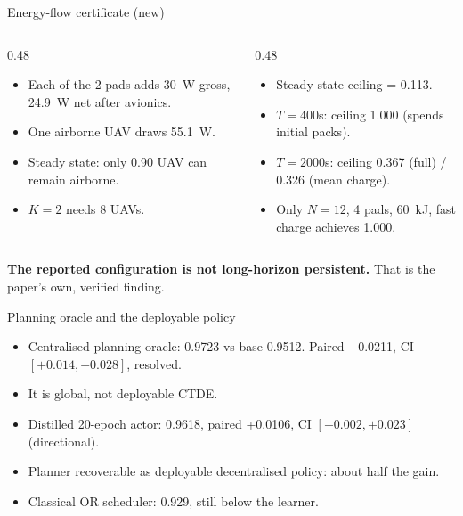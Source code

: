 \documentclass[aspectratio=169,10pt]{beamer}
\begin{document}
\begin{frame}{Energy-flow certificate (new)}
  \begin{columns}
    \begin{column}{0.48\textwidth}
      \small
      \begin{itemize}
        \item Each of the 2 pads adds 30~W gross, 24.9~W net after avionics.
        \item One airborne UAV draws 55.1~W.
        \item Steady state: only 0.90 UAV can remain airborne.
        \item $K{=}2$ needs 8 UAVs.
      \end{itemize}
    \end{column}
    \begin{column}{0.48\textwidth}
      \small
      \begin{itemize}
        \item Steady-state ceiling = 0.113.
        \item $T{=}400$s: ceiling 1.000 (spends initial packs).
        \item $T{=}2000$s: ceiling 0.367 (full) / 0.326 (mean charge).
        \item Only $N{=}12$, 4 pads, 60~kJ, fast charge achieves 1.000.
      \end{itemize}
    \end{column}
  \end{columns}
  \vspace{0.2cm}
  {\footnotesize \textbf{The reported configuration is not long-horizon persistent.} That is the paper's own, verified finding.}
\end{frame}

\begin{frame}{Planning oracle and the deployable policy}
  \begin{itemize}
    \item Centralised planning oracle: 0.9723 vs base 0.9512.
          Paired +0.0211, CI $[+0.014,+0.028]$, resolved.
    \item It is global, not deployable CTDE.
    \item Distilled 20-epoch actor: 0.9618, paired +0.0106, CI $[-0.002,+0.023]$ (directional).
    \item Planner recoverable as deployable decentralised policy: about half the gain.
    \item Classical OR scheduler: 0.929, still below the learner.
  \end{itemize}
\end{frame}
\end{document}
